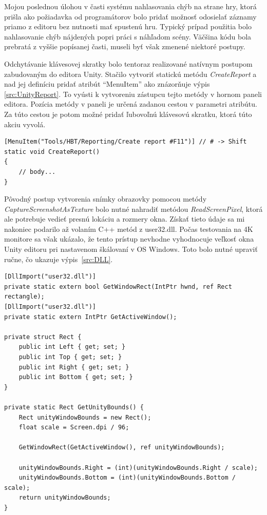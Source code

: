 \documentclass[slovak, bachelorpractice]{diploma}
\begin{document}
Mojou poslednou úlohou v časti systému nahlasovania chýb na strane hry, ktorá prišla ako požiadavka od programátorov bolo pridať možnosť odosielať záznamy priamo z editoru bez nutnosti mať spustenú hru. Typický prípad použitia bolo nahlasovanie chýb nájdených popri práci s náhľadom scény. Väčšina kódu bola prebratá z vyššie popísanej časti, museli byť však zmenené niektoré postupy. 

Odchytávanie klávesovej skratky bolo tentoraz realizované natívnym postupom zabudovaným do editora Unity. Stačilo vytvoriť statickú metódu \textit{CreateReport} a nad jej definíciu pridať atribút \enquote{MenuItem} ako znázorňuje výpis \ref{src:UnityReport}. To vyústi k vytvoreniu zástupcu tejto metódy v hornom paneli editora. Pozícia metódy v paneli je určená zadanou cestou v parametri atribútu. Za túto cestou je potom možné pridať ľubovoľnú klávesovú skratku, ktorá túto akciu vyvolá.
\vspace{15pt}
\begin{lstlisting}[label=src:UnityReport,caption={Odchytenie stlačenia klávesovej skratky v rámci editora Unity}]
[MenuItem("Tools/HBT/Reporting/Create report #F11")] // # -> Shift
static void CreateReport()
{
    // body...
}
\end{lstlisting}
\vspace{5pt}

Pôvodný postup vytvorenia snímky obrazovky pomocou metódy \textit{CaptureScreenshotAsTexture} bolo nutné nahradiť metódou \textit{ReadScreenPixel}, ktorá ale potrebuje vedieť presnú lokáciu a rozmery okna. Získať tieto údaje sa mi nakoniec podarilo až volaním C++ metód z user32.dll. Počas testovania na 4K monitore sa však ukázalo, že tento prístup nevhodne vyhodnocuje veľkosť okna Unity editoru pri nastavenom škálovaní v OS Windows. Toto bolo nutné upraviť ručne, čo ukazuje \mbox{výpis \ref{src:DLL}}.
\vspace{10pt}
\begin{lstlisting}[label=src:DLL,caption={Získanie veľkosti okna spustenej aplikácie}]
[DllImport("user32.dll")]
private static extern bool GetWindowRect(IntPtr hwnd, ref Rect rectangle);
[DllImport("user32.dll")]
private static extern IntPtr GetActiveWindow();

private struct Rect {
    public int Left { get; set; }
    public int Top { get; set; }
    public int Right { get; set; }
    public int Bottom { get; set; }
}

private static Rect GetUnityBounds() {
    Rect unityWindowBounds = new Rect();
    float scale = Screen.dpi / 96;

    GetWindowRect(GetActiveWindow(), ref unityWindowBounds);

    unityWindowBounds.Right = (int)(unityWindowBounds.Right / scale);
    unityWindowBounds.Bottom = (int)(unityWindowBounds.Bottom / scale);
    return unityWindowBounds;
}
\end{lstlisting}
\end{document}
